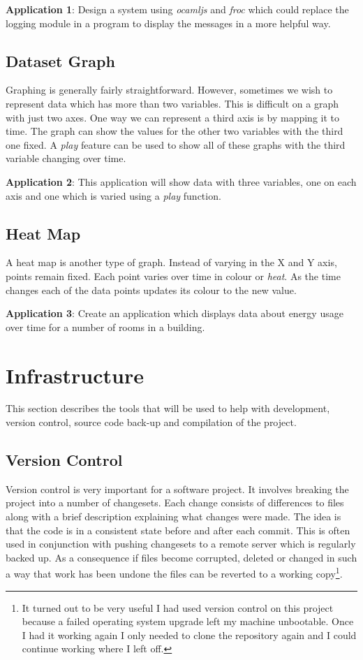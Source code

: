 \textbf{Application 1}: Design a system using \emph{ocamljs} and \emph{froc} which could replace the logging module in a program to display the messages in a more helpful way.

\subsection{Dataset Graph}
Graphing is generally fairly straightforward. However, sometimes we wish to represent data which has more than two variables. This is difficult on a graph with just two axes. One way we can represent a third axis is by mapping it to time. The graph can show the values for the other two variables with the third one fixed. A \emph{play} feature can be used to show all of these graphs with the third variable changing over time.

\textbf{Application 2}: This application will show data with three variables, one on each axis and one which is varied using a \emph{play} function. 

\subsection{Heat Map}
A heat map is another type of graph. Instead of varying in the X and Y axis, points remain fixed. Each point varies over time in colour or \emph{heat}. As the time changes each of the data points updates its colour to the new value.

\textbf{Application 3}: Create an application which displays data about energy usage over time for a number of rooms in a building.

\section{Infrastructure}

This section describes the tools that will be used to help with development, version control, source code back-up and compilation of the project.

\subsection{Version Control}
Version control is very important for a software project. It involves breaking the project into a number of changesets. Each change consists of differences to files along with a brief description explaining what changes were made. The idea is that the code is in a consistent state before and after each commit. This is often used in conjunction with pushing changesets to a remote server which is regularly backed up. As a consequence if files become corrupted, deleted or changed in such a way that work has been undone the files can be reverted to a working copy\footnote{It turned out to be very useful I had used version control on this project because a failed operating system upgrade left my machine unbootable. Once I had it working again I only needed to clone the repository again and I could continue working where I left off.}.

